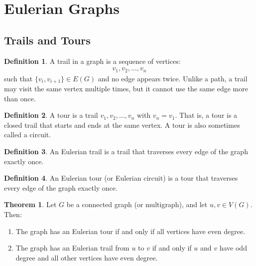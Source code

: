 \documentclass{article}
\theoremstyle{definition}
\newtheorem{theorem}{Theorem}
\newtheorem{definition}{Definition}
\begin{document}
\section{Eulerian Graphs}

\subsection{Trails and Tours}

\begin{definition}
A trail in a graph is a sequence of vertices:
\begin{align*}
v_1, v_2, \ldots, v_n
\end{align*}
such that $\{v_i, v_{i+1}\} \in E(G)$ and no edge appears twice. Unlike a path, a trail may visit the same vertex multiple times, but it cannot use the same edge more than once.
\end{definition}

\begin{definition}
A tour is a trail $v_1, v_2, \ldots, v_n$ with $v_n = v_1$. That is, a tour is a closed trail that starts and ends at the same vertex. A tour is also sometimes called a circuit.
\end{definition}

\begin{definition}
An Eulerian trail is a trail that traverses every edge of the graph exactly once.
\end{definition}

\begin{definition}
An Eulerian tour (or Eulerian circuit) is a tour that traverses every edge of the graph exactly once.
\end{definition}

\begin{theorem}
Let $G$ be a connected graph (or multigraph), and let $u, v \in V(G)$. Then:
\begin{enumerate}
\item The graph has an Eulerian tour if and only if all vertices have even degree.
\item The graph has an Eulerian trail from $u$ to $v$ if and only if $u$ and $v$ have odd degree and all other vertices have even degree.
\end{enumerate}
\end{theorem}
\end{document}
